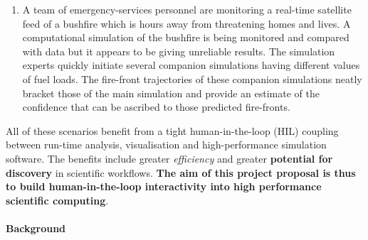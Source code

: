 \documentclass[a4paper,fontsize=12pt]{scrartcl}
\begin{document}
\begin{enumerate}


\item A team of emergency-services personnel are monitoring a
  real-time satellite feed of a bushfire which is hours away from
  threatening homes and lives. A computational simulation of the
  bushfire is being monitored and compared with data but it appears to
  be giving unreliable results. The simulation experts quickly
  initiate several companion simulations having different values of
  fuel loads. The fire-front trajectories of these companion
  simulations neatly bracket those of the main simulation and provide
  an estimate of the confidence that can be ascribed to those
  predicted fire-fronts.


\end{enumerate}

All of these scenarios benefit from a tight human-in-the-loop (HIL)
coupling between run-time analysis, visualisation and high-performance
simulation software. The benefits include greater \emph{efficiency}
and greater \textbf{potential for discovery} in scientific workflows.
\textbf{The aim of this project proposal is thus to build
  human-in-the-loop interactivity into high performance scientific
  computing}.

\paragraph*{Background}\mbox{}\\
\end{document}

